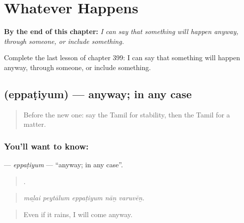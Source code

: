 
\chapter{Whatever Happens}
\label{ch:ta-whatever-happens}

\begin{chapteropening}
\textbf{By the end of this chapter:} \emph{I can say that something will happen anyway, through someone, or include something.}

Complete the last lesson of chapter 399: I can say that something will happen anyway, through someone, or include something.
\end{chapteropening}

\section[\texorpdfstring{\ta{எப்படியும்} (eppaṭiyum)}{எப்படியும் (eppaṭiyum)}]{ (eppaṭiyum) — anyway; in any case}

\label{lesson:TA-C399-eppatiyum}



\begin{quote}
Before the new one: say the Tamil for stability, then the Tamil for a matter.
\end{quote}

\subsection*{You'll want to know: }
\textbf{} — \emph{eppaṭiyum} — \textquotedblleft{}anyway; in any case\textquotedblright{}.

\begin{quote}
    .
\end{quote}

\begin{quote}
\emph{maḻai peytālum eppaṭiyum nāṉ varuvēṉ.}
\end{quote}

\begin{quote}
Even if it rains, I will come anyway.
\end{quote}

